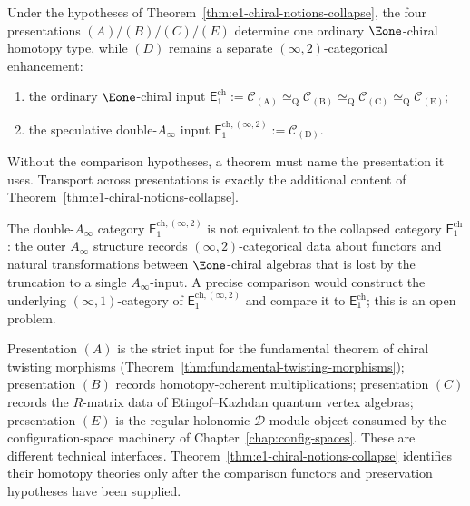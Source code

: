 \begin{corollary}
\label{cor:e1-chiral-two-notion-registry}
\ClaimStatusConditional
{}
Under the hypotheses of
Theorem~\ref{thm:e1-chiral-notions-collapse}, the four
presentations $(A)/(B)/(C)/(E)$ determine one ordinary
$\Eone$-chiral homotopy type, while $(D)$ remains a separate
$(\infty,2)$-categorical enhancement:
\begin{enumerate}[label=\textup{(\roman*)}]
\item the ordinary $\Eone$-chiral input
 $\mathsf{E}_1^{\mathrm{ch}} :=
 \mathscr{C}_{(\mathrm{A})} \simeq_{\mathrm{Q}}
 \mathscr{C}_{(\mathrm{B})} \simeq_{\mathrm{Q}}
 \mathscr{C}_{(\mathrm{C})} \simeq_{\mathrm{Q}}
 \mathscr{C}_{(\mathrm{E})}$;
\item the speculative double-$A_\infty$ input
 $\mathsf{E}_1^{\mathrm{ch},(\infty,2)} :=
 \mathscr{C}_{(\mathrm{D})}$.
\end{enumerate}
Without the comparison hypotheses, a theorem must name the
presentation it uses. Transport across presentations is exactly
the additional content of
Theorem~\ref{thm:e1-chiral-notions-collapse}.
\end{corollary}

\begin{conjecture}
\label{conj:double-ainfty-notion-D-relation}
The double-$A_\infty$ category
$\mathsf{E}_1^{\mathrm{ch},(\infty,2)}$ is not equivalent to
the collapsed category $\mathsf{E}_1^{\mathrm{ch}}$: the outer
$A_\infty$ structure records $(\infty,2)$-categorical data
about functors and natural transformations between
$\Eone$-chiral algebras that is lost by the truncation to a
single $A_\infty$-input. A precise comparison would construct
the underlying $(\infty,1)$-category of
$\mathsf{E}_1^{\mathrm{ch},(\infty,2)}$ and compare it to
$\mathsf{E}_1^{\mathrm{ch}}$; this is an open problem.
\end{conjecture}

\begin{remark}
\label{rem:five-notions-kapranov-origin}
Presentation $(A)$ is the strict input for the fundamental
theorem of chiral twisting morphisms
(Theorem~\ref{thm:fundamental-twisting-morphisms});
presentation $(B)$ records homotopy-coherent multiplications;
presentation $(C)$ records the $R$-matrix data of
Etingof--Kazhdan quantum vertex algebras; presentation $(E)$ is
the regular holonomic $\mathcal D$-module object consumed by the
configuration-space machinery of Chapter~\ref{chap:config-spaces}.
These are different technical interfaces. Theorem~\ref{thm:e1-chiral-notions-collapse}
identifies their homotopy theories only after the comparison
functors and preservation hypotheses have been supplied.
\end{remark}

